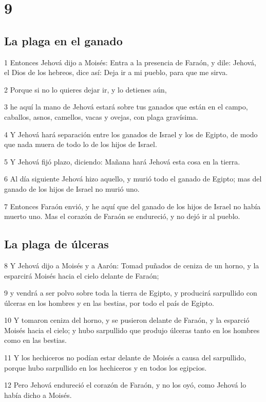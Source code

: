 \chapter{9}

\section*{La plaga en el ganado}

\par 1 Entonces Jehová dijo a Moisés: Entra a la presencia de Faraón, y dile: Jehová, el Dios de los hebreos, dice así: Deja ir a mi pueblo, para que me sirva.
\par 2 Porque si no lo quieres dejar ir, y lo detienes aún,
\par 3 he aquí la mano de Jehová estará sobre tus ganados que están en el campo, caballos, asnos, camellos, vacas y ovejas, con plaga gravísima.
\par 4 Y Jehová hará separación entre los ganados de Israel y los de Egipto, de modo que nada muera de todo lo de los hijos de Israel.
\par 5 Y Jehová fijó plazo, diciendo: Mañana hará Jehová esta cosa en la tierra.
\par 6 Al día siguiente Jehová hizo aquello, y murió todo el ganado de Egipto; mas del ganado de los hijos de Israel no murió uno.
\par 7 Entonces Faraón envió, y he aquí que del ganado de los hijos de Israel no había muerto uno. Mas el corazón de Faraón se endureció, y no dejó ir al pueblo.

\section*{La plaga de úlceras}

\par 8 Y Jehová dijo a Moisés y a Aarón: Tomad puñados de ceniza de un horno, y la esparcirá Moisés hacia el cielo delante de Faraón;
\par 9 y vendrá a ser polvo sobre toda la tierra de Egipto, y producirá sarpullido con úlceras en los hombres y en las bestias, por todo el país de Egipto.
\par 10 Y tomaron ceniza del horno, y se pusieron delante de Faraón, y la esparció Moisés hacia el cielo; y hubo sarpullido que produjo úlceras tanto en los hombres como en las bestias.
\par 11 Y los hechiceros no podían estar delante de Moisés a causa del sarpullido, porque hubo sarpullido en los hechiceros y en todos los egipcios.
\par 12 Pero Jehová endureció el corazón de Faraón, y no los oyó, como Jehová lo había dicho a Moisés.

